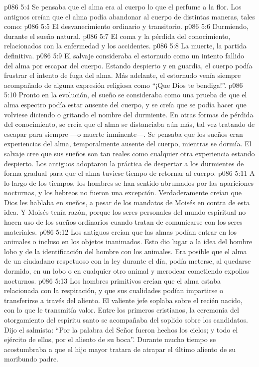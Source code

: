 \vs p086 5:4 Se pensaba que el alma era al cuerpo lo que el perfume a la flor. Los antiguos creían que el alma podía abandonar al cuerpo de distintas maneras, tales como:
\vs p086 5:5 El desvanecimiento ordinario y transitorio.
\vs p086 5:6 Durmiendo, durante el sueño natural.
\vs p086 5:7 El coma y la pérdida del conocimiento, relacionados con la enfermedad y los accidentes.
\vs p086 5:8 La muerte, la partida definitiva.
\vs p086 5:9 \pc El salvaje consideraba el estornudo como un intento fallido del alma por escapar del cuerpo. Estando despierto y en guardia, el cuerpo podía frustrar el intento de fuga del alma. Más adelante, el estornudo venía siempre acompañado de alguna expresión religiosa como “¡Que Dios te bendiga!”.
\vs p086 5:10 \pc Pronto en la evolución, el sueño se consideraba como una prueba de que el alma espectro podía estar ausente del cuerpo, y se creía que se podía hacer que volviese diciendo o gritando el nombre del durmiente. En otras formas de pérdida del conocimiento, se creía que el alma se distanciaba aún más, tal vez tratando de escapar para siempre ---o muerte inminente---. Se pensaba que los sueños eran experiencias del alma, temporalmente ausente del cuerpo, mientras se dormía. El salvaje cree que sus sueños son tan reales como cualquier otra experiencia estando despierto. Los antiguos adoptaron la práctica de despertar a los durmientes de forma gradual para que el alma tuviese tiempo de retornar al cuerpo.
\vs p086 5:11 A lo largo de los tiempos, los hombres se han sentido abrumados por las apariciones nocturnas, y los hebreos no fueron una excepción. Verdaderamente creían que Dios les hablaba en sueños, a pesar de los mandatos de Moisés en contra de esta idea. Y Moisés tenía razón, porque los seres personales del mundo espiritual no hacen uso de los sueños ordinarios cuando tratan de comunicarse con los seres materiales.
\vs p086 5:12 Los antiguos creían que las almas podían entrar en los animales o incluso en los objetos inanimados. Esto dio lugar a la idea del hombre lobo y de la identificación del hombre con los animales. Era posible que el alma de un ciudadano respetuoso con la ley durante el día, podía meterse, al quedarse dormido, en un lobo o en cualquier otro animal y merodear cometiendo expolios nocturnos.
\vs p086 5:13 Los hombres primitivos creían que el alma estaba relacionada con la respiración, y que sus cualidades podían impartirse o transferirse a través del aliento. El valiente jefe soplaba sobre el recién nacido, con lo que le transmitía valor. Entre los primeros cristianos, la ceremonia del otorgamiento del espíritu santo se acompañaba del soplido sobre los candidatos. Dijo el salmista: “Por la palabra del Señor fueron hechos los cielos; y todo el ejército de ellos, por el aliento de su boca”. Durante mucho tiempo se acostumbraba a que el hijo mayor tratara de atrapar el último aliento de su moribundo padre.
